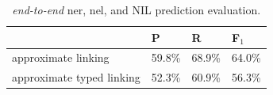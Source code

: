 \begin{table}[H]
    \centering
    \begin{tabular}{l|lll}
        & P & R & F$_1$ \\
        \hline
        approximate linking      & 59.8\% & 68.9\% & 64.0\% \\
        approximate typed linking & 52.3\% & 60.9\% & 56.3\% \\
    \end{tabular}
    \caption{\textit{end-to-end} \ac{ner}, \ac{nel}, and NIL prediction evaluation.}
    \label{tab:nereval:withlink}
\end{table}